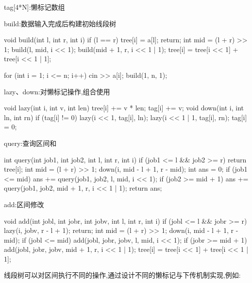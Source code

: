 \documentclass[UTF8,a4paper,11pt]{ctexart}
\newcommand{\topic}[1]{%
  \par\needspace{3\baselineskip}\vspace{0.45em}%
  \noindent{\bfseries\color{Primary}#1}\par\vspace{0.12em}%
}
\begin{document}
tag[4*N]:懒标记数组

\topic{区间和模板}

build:数据输入完成后构建初始线段树

\begin{CodeBlock}
void build(int l, int r, int i) {
    if (l == r) {
        tree[i] = a[l];
        return;
    }
    int mid = (l + r) >> 1;
    build(l, mid, i << 1);
    build(mid + 1, r, i << 1 | 1);
    tree[i] = tree[i << 1] + tree[i << 1 | 1];
}
\end{CodeBlock}

\begin{CodeBlock}
for (int i = 1; i <= n; i++)
    cin >> a[i];
build(1, n, 1);
\end{CodeBlock}

\begin{CodeBlock}
lazy、down:对懒标记操作,组合使用
\end{CodeBlock}

\begin{CodeBlock}
void lazy(int i, int v, int len) {
    tree[i] += v * len;
    tag[i] += v;
}
void down(int i, int ln, int rn) {
    if (tag[i] != 0) {
        lazy(i << 1, tag[i], ln);
        lazy(i << 1 | 1, tag[i], rn);
        tag[i] = 0;
    }
}
\end{CodeBlock}

query:查询区间和

\begin{CodeBlock}
int query(int job1, int job2, int l, int r, int i) {
    if (job1 <= l && job2 >= r)
        return tree[i];
    int mid = (l + r) >> 1;
    down(i, mid - l + 1, r - mid);
    int ans = 0;
    if (job1 <= mid)
        ans += query(job1, job2, l, mid, i << 1);
    if (job2 >= mid + 1)
        ans += query(job1, job2, mid + 1, r, i << 1 | 1);
    return ans;
}
\end{CodeBlock}

add:区间修改

\begin{CodeBlock}
void add(int jobl, int jobr, int jobv, int l, int r, int i) {
    if (jobl <= l && jobr >= r) {
        lazy(i, jobv, r - l + 1);
        return;
    }
    int mid = (l + r) >> 1;
    down(i, mid - l + 1, r - mid);
    if (jobl <= mid)
        add(jobl, jobr, jobv, l, mid, i << 1);
    if (jobr >= mid + 1)
        add(jobl, jobr, jobv, mid + 1, r, i << 1 | 1);
    tree[i] = tree[i << 1] + tree[i << 1 | 1];
}
\end{CodeBlock}

线段树可以对区间执行不同的操作,通过设计不同的懒标记与下传机制实现,例如:
\end{document}
